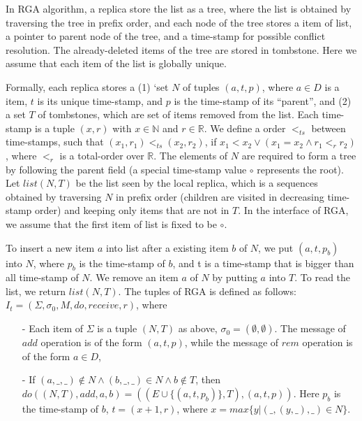 \begin{example}[RGA]
\label{definition:rga implementation}
In RGA algorithm, a replica store the list as a tree, where the list is obtained by traversing the tree in prefix order, and each node of the tree stores a item of list, a pointer to parent node of the tree, and a time-stamp for possible conflict resolution. The already-deleted items of the tree are stored in tombstone. Here we assume that each item of the list is globally unique.

Formally, each replica stores a (1) `set $N$ of tuples $(a,t,p)$, where $a \in D$ is a item, $t$ is its unique time-stamp, and $p$ is the time-stamp of its ``parent'', and (2) a set $T$ of tombstones, which are set of items removed from the list. Each time-stamp is a tuple $(x,r)$ with $x \in \mathbb{N}$ and $r \in \mathbb{R}$. We define a order $<_{\mathit{ts}}$ between time-stamps, such that $(x_1,r_1) <_{\mathit{ts}} (x_2,r_2)$, if $x_1 < x_2 \vee (x_1 = x_2 \wedge r_1 <_r r_2)$, where $<_r$ is a total-order over $\mathbb{R}$. The elements of $N$ are required to form a tree by following the parent field (a special time-stamp value $\circ$ represents the root). Let $\mathit{list}(N,T)$ be the list seen by the local replica, which is a sequences obtained by traversing $N$ in prefix order (children are visited in decreasing time-stamp order) and keeping only items that are not in $T$. In the interface of RGA, we assume that the first item of list is fixed to be $\circ$. 

To insert a new item $a$ into list after a existing item $b$ of $N$, we put $(a,t,p_b)$ into $N$, where $p_b$ is the time-stamp of $b$, and t is a time-stamp that is bigger than all time-stamp of $N$. We remove an item $a$ of $N$ by putting $a$ into $T$. To read the list, we return $\mathit{list}(N,T)$. The tuples of RGA is defined as follows: $I_t = (\Sigma, \sigma_0, M, \mathit{do},\mathit{receive},r)$, where

\begin{itemize}
\setlength{\itemsep}{0.5pt}
\item[-] Each item of $\Sigma$ is a tuple $(N,T)$ as above, $\sigma_0 = (\emptyset, \emptyset)$. The message of $\mathit{add}$ operation is of the form $(a,t,p)$, while the message of $\mathit{rem}$ operation is of the form $a \in D$,  
    
\item[-] If $(a,\_,\_) \notin N \wedge (b,\_,\_) \in N \wedge b \notin T$, then $\mathit{do}((N,T),\mathit{add},a,b) = ((E \cup \{ (a,t,p_b) \},T),(a,t,p))$. Here $p_b$ is the time-stamp of $b$, $t = (x+1,r)$, where $x = \mathit{max}\{ y \vert (\_,(y,\_),\_) \in N \}$. 


\end{itemize}
\end{example}
